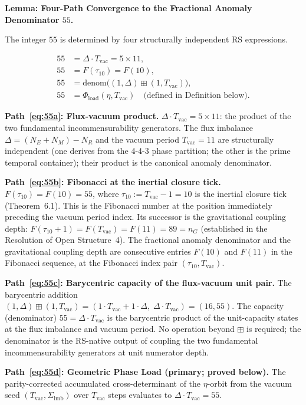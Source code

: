 \documentclass[11pt, letterpaper]{article}
\theoremstyle{definition}
\theoremstyle{plain}
\begin{document}
\begin{rsbox}
\textbf{Lemma: Four-Path Convergence to the Fractional Anomaly Denominator $55$.}

The integer $55$ is determined by four structurally independent RS expressions.

\begin{align}
    55 &= \Delta \cdot T_\mathrm{vac} = 5 \times 11, \label{eq:55a}\\
    55 &= F(\tau_{10}) = F(10), \label{eq:55b}\\
    55 &= \mathrm{denom}\bigl((1,\Delta) \boxplus (1,T_\mathrm{vac})\bigr), \label{eq:55c}\\
    55 &= \Phi_\mathrm{load}(\eta, T_\mathrm{vac})\quad \text{(defined in Definition below).} \label{eq:55d}
\end{align}

\textbf{Path~\eqref{eq:55a}: Flux-vacuum product.}
$\Delta \cdot T_\mathrm{vac} = 5 \times 11$: the product of the two fundamental
incommensurability generators. The flux imbalance $\Delta = (N_E + N_M) - N_R$
and the vacuum period $T_\mathrm{vac} = 11$ are structurally independent
(one derives from the 4-4-3 phase partition; the other is the prime temporal
container); their product is the canonical anomaly denominator.

\textbf{Path~\eqref{eq:55b}: Fibonacci at the inertial closure tick.}
$F(\tau_{10}) = F(10) = 55$, where $\tau_{10} := T_\mathrm{vac} - 1 = 10$ is the
inertial closure tick (Theorem~6.1). This is the Fibonacci number at the position
immediately preceding the vacuum period index. Its successor is the gravitational
coupling depth: $F(\tau_{10}+1) = F(T_\mathrm{vac}) = F(11) = 89 = n_G$
(established in the Resolution of Open Structure~4). The fractional anomaly
denominator and the gravitational coupling depth are consecutive entries $F(10)$
and $F(11)$ in the Fibonacci sequence, at the Fibonacci index pair $(\tau_{10},
T_\mathrm{vac})$.

\textbf{Path~\eqref{eq:55c}: Barycentric capacity of the flux-vacuum unit pair.}
The barycentric addition $(1,\Delta) \boxplus (1,T_\mathrm{vac}) = (1 \cdot T_\mathrm{vac}
+ 1 \cdot \Delta,\; \Delta \cdot T_\mathrm{vac}) = (16, 55)$.
The capacity (denominator) $55 = \Delta \cdot T_\mathrm{vac}$ is the barycentric
product of the unit-capacity states at the flux imbalance and vacuum period.
No operation beyond $\boxplus$ is required; the denominator is the RS-native
output of coupling the two fundamental incommensurability generators at unit
numerator depth.

\textbf{Path~\eqref{eq:55d}: Geometric Phase Load (primary; proved below).}
The parity-corrected accumulated cross-determinant of the $\eta$-orbit from the
vacuum seed $(T_\mathrm{vac}, \Sigma_\mathrm{imb})$ over $T_\mathrm{vac}$ steps
evaluates to $\Delta \cdot T_\mathrm{vac} = 55$.
\end{rsbox}
\end{document}
